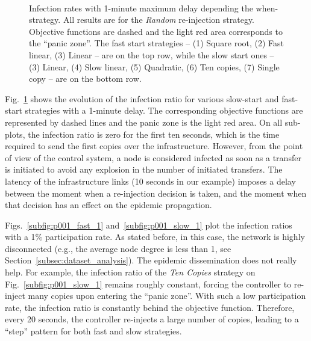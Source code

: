 \documentclass[preprint]{elsarticle}
\begin{document}
\begin{figure}[t]
  \centering
   \quad
   \quad
   \\
   \quad
   \quad
  \caption{Infection rates with 1-minute maximum delay depending the when-strategy. All results are for the \textit{Random} re-injection strategy. Objective functions are dashed and the light red area corresponds to the ``panic zone''. The fast start strategies -- (1) Square root, (2) Fast linear, (3) Linear -- are on the top row, while the slow start ones -- (3) Linear, (4) Slow linear, (5) Quadratic, (6) Ten copies, (7) Single copy -- are on the bottom row.}
  \label{fig:dynamic_1}
\end{figure}

Fig.~\ref{fig:dynamic_1} shows the evolution of the infection ratio for various slow-start and fast-start strategies with a 1-minute delay. The corresponding objective functions are represented by dashed lines and the panic zone is the light red area. On all sub-plots, the infection ratio is zero for the first ten seconds, which is the time required to send the first copies over the infrastructure. However, from the point of view of the control system, a node is considered infected as soon as a transfer is initiated to avoid any explosion in the number of initiated transfers. The latency of the infrastructure links (10 seconds in our example) imposes a delay between the moment when a re-injection decision is taken, and the moment when that decision has an effect on the epidemic propagation.

Figs.~\ref{subfig:p001_fast_1} and~\ref{subfig:p001_slow_1} plot the infection ratios with a 1\% participation rate. As stated before, in this case, the network is highly disconnected (e.g., the average node degree is less than 1, see Section~\ref{subsec:dataset_analysis}). The epidemic dissemination does not really help. For example, the infection ratio of the \textit{Ten Copies} strategy on Fig.~\ref{subfig:p001_slow_1} remains roughly constant, forcing the controller to re-inject many copies upon entering the ``panic zone''.  With such a low participation rate, the infection ratio is constantly behind the objective function. Therefore, every 20 seconds, the controller re-injects a large number of copies, leading to a ``step'' pattern for both fast and slow strategies.
\end{document}
